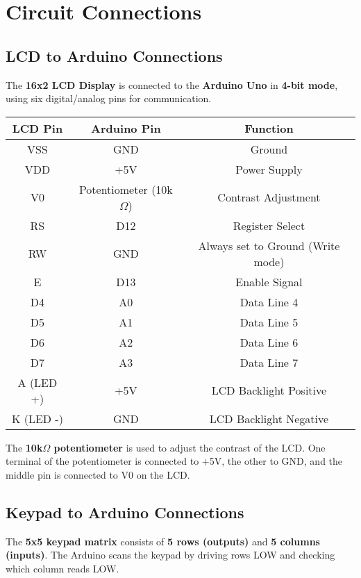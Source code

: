 \documentclass[journal,12pt,onecolumn]{IEEEtran}
\theoremstyle{remark}
\begin{document}
\section{Circuit Connections}

\subsection{LCD to Arduino Connections}
The \textbf{16x2 LCD Display} is connected to the \textbf{Arduino Uno} in \textbf{4-bit mode}, using six digital/analog pins for communication.

\begin{center}
\begin{tabular}{|c|c|c|}
\hline
\textbf{LCD Pin} & \textbf{Arduino Pin} & \textbf{Function} \\
\hline
VSS & GND & Ground \\
VDD & +5V & Power Supply \\
V0 & Potentiometer (10k$\Omega$) & Contrast Adjustment \\
RS & D12 & Register Select \\
RW & GND & Always set to Ground (Write mode) \\
E & D13 & Enable Signal \\
D4 & A0 & Data Line 4 \\
D5 & A1 & Data Line 5 \\
D6 & A2 & Data Line 6 \\
D7 & A3 & Data Line 7 \\
A (LED +) & +5V & LCD Backlight Positive \\
K (LED -) & GND & LCD Backlight Negative \\
\hline
\end{tabular}
\end{center}

The \textbf{10k$\Omega$ potentiometer} is used to adjust the contrast of the LCD. One terminal of the potentiometer is connected to +5V, the other to GND, and the middle pin is connected to V0 on the LCD.

\subsection{Keypad to Arduino Connections}
The \textbf{5x5 keypad matrix} consists of \textbf{5 rows (outputs)} and \textbf{5 columns (inputs)}. The Arduino scans the keypad by driving rows LOW and checking which column reads LOW.
\end{document}
